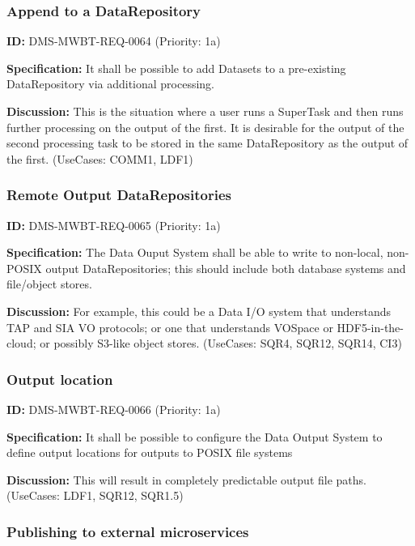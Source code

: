 \documentclass[SE,toc,lsstdraft]{lsstdoc}
\begin{document}
\subsubsection{Append to a DataRepository}

\label{DMS-MWBT-REQ-0064}
\textbf{ID:} DMS-MWBT-REQ-0064 (Priority: 1a)

\textbf{Specification:}
It shall be possible to add Datasets to a pre-existing DataRepository via additional processing.

\textbf{Discussion:}
This is the situation where a user runs a SuperTask and then runs further processing on the output of the first. It is desirable for the output of the second processing task to be stored in the same DataRepository as the output of the first. (UseCases: COMM1, LDF1)

\subsubsection{Remote Output DataRepositories}

\label{DMS-MWBT-REQ-0065}
\textbf{ID:} DMS-MWBT-REQ-0065 (Priority: 1a)

\textbf{Specification:}
The Data Ouput System shall be able to write to non-local, non-POSIX output DataRepositories; this should include both database systems and file/object stores.

\textbf{Discussion:}
For example, this could be a Data I/O system that understands TAP and SIA VO protocols; or one that understands VOSpace or HDF5-in-the-cloud; or possibly S3-like object stores. (UseCases: SQR4, SQR12, SQR14, CI3)

\subsubsection{Output location}

\label{DMS-MWBT-REQ-0066}
\textbf{ID:} DMS-MWBT-REQ-0066 (Priority: 1a)

\textbf{Specification:}
It shall be possible to configure the Data Output System to define output locations for outputs to POSIX file systems

\textbf{Discussion:}
This will result in completely predictable output file paths. (UseCases: LDF1, SQR12, SQR1.5)

\subsubsection{Publishing to external microservices}
\end{document}
